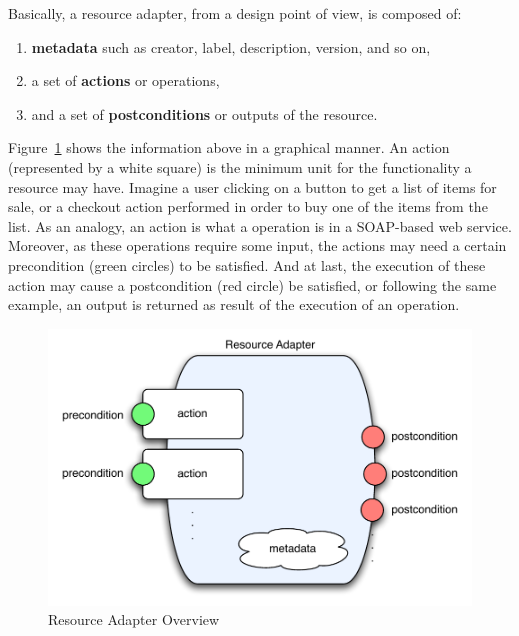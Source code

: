 \documentclass{fast_latex}
\begin{document}
Basically, a resource adapter, from a design point of view, is composed of:

\begin{enumerate}
	\item \textbf{metadata} such as creator, label, description, version, and so on,
	\item a set of \textbf{actions} or operations,
	\item and a set of \textbf{postconditions} or outputs of the resource.
\end{enumerate}

Figure~\ref{fig:resource_adapter_overview} shows the information above in a graphical manner. An action (represented by a white square) is the minimum unit for the functionality a resource may have. Imagine a user clicking on a button to get a list of items for sale, or a checkout action performed in order to buy one of the items from the list. As an analogy, an action is what a operation is in a SOAP-based web service. Moreover, as these operations require some input, the actions may need a certain precondition (green circles) to be satisfied. And at last, the execution of these action may cause a postcondition (red circle) be satisfied, or following the same example, an output is returned as result of the execution of an operation.

\begin{figure}[!htb]
  \begin{center}
    \includegraphics[width=12cm]{images/resource_adapter.pdf}
    \caption{Resource Adapter Overview}
    \label{fig:resource_adapter_overview}
  \end{center}
\end{figure}

\end{document}
